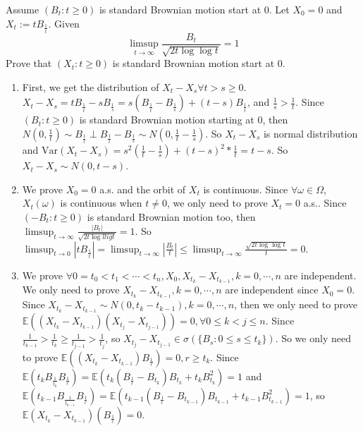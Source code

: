 \documentclass{ctexart}
\begin{document}
\begin{problem}\label{pro:4}
  Assume \((B_t:t \geq 0)\) is standard Brownian motion start at \(0\).
  Let \(X_0=0\) and \(X_t:=t B_{\frac{1}{t}}\).
  Given
  \[
    \limsup_{t \to \infty}\frac{B_{t}}{\sqrt{2t \log \log t}}=1
  \]
  Prove that \((X_t:t \geq 0)\) is standard Brownian motion start at \(0\).
\end{problem}
\begin{solution}
  \begin{enumerate}
    \item First, we get the distribution of \(X_t-X_s \forall t > s \geq0\). \(X_t-X_s=t B_{\frac{1}{t}}-s B_{\frac{1}{s}}=s(B_{\frac{1}{t}}-B_{\frac{1}{s}})+(t-s)B_{\frac{1}{t}}\),
      and \(\frac{1}{s} > \frac{1}{t}\). Since \((B_t:t \geq 0)\) is standard Brownian motion starting at 0, then \(N(0, \frac{1}{t})\sim B_{\frac{1}{t}} \perp B_{\frac{1}{t}} - B_{\frac{1}{s}}\sim N(0,\frac{1}{t }-\frac{1}{s})\).
      So \(X_t-X_s\) is normal distribution and \(\mathrm{Var}(X_t-X_s)=s^2(\frac{1}{t}-\frac{1}{s}) + (t-s)^2*\frac{1}{t}=t-s\).
      So \(X_t-X_s \sim N(0, t-s)\).
    \item We prove \(X_0=0\) a.s. and the orbit of \(X_t\) is continuous.
      Since \(\forall \omega \in \Omega\), \(X_t(\omega)\) is continuous when \(t \neq 0\), we only need to prove \(X_t=0\) a.s..
      Since \((-B_t: t \geq 0)\) is standard Brownian motion too, then \(\limsup_{t \to \infty} \frac{|B_t|}{\sqrt{2t \log llig t}}=1\).
      So \(\limsup_{t \to 0}|tB_{\frac{1}{t}}|= \limsup_{t \to \infty} |\frac{B_t}{t}| \leq \limsup_{t \to \infty} \frac{\sqrt{2t \log \log t}}{t}=0\).
    \item We prove \(\forall 0=t_0 < t_1 <\cdots<t_n, X_0, X_{t_k}-X_{t_{k-1}}, k=0,\cdots,n\) are independent.
      We only need to prove \(X_{t_k}-X_{t_{k-1}}, k=0,\cdots,n\) are independent since \(X_0=0\).
      Since \(X_{t_k}-X_{t_{k-1}} \sim N(0, t_k-t_{k-1}), k=0,\cdots,n\),
      then we only need to prove \(\mathbb{E}((X_{t_k}-X_{t_{k-1}})(X_{t_j}-X_{t_{j-1}}))=0, \forall 0 \leq k<j \leq n\).
      Since \(\frac{1}{t_{k-1}} > \frac{1}{t_k} \geq \frac{1}{t_{j-1}}> \frac{1}{t_j}\), so \(X_{t_j}-X_{t_{j-1}} \in \sigma(\{B_{s}:0 \leq s \leq t_{k}\})\).
      So we only need to prove \(\mathbb{E}((X_{t_k}-X_{t_{k-1}})B_{\frac{1}{r}})=0, r \geq t_{k}\).
      Since \(\mathbb{E}(t_kB_{\frac{1}{t_k}}B_{\frac{1}{r}})=\mathbb{E}(t_k(B_{\frac{1}{r}}-B_{t_k})B_{t_k} + t_kB_{t_k}^2)=1\)
      and \(\mathbb{E}(t_{k-1}B_{\frac{1}{t_{k-1}}}B_{\frac{1}{r}})=\mathbb{E}(t_{k-1}(B_{\frac{1}{r}}-B_{t_{k-1}})B_{t_{k-1}} + t_{k-1}B_{t_{k-1}}^2)=1\),
      so \(\mathbb{E}(X_{t_k}-X_{t_{k-1}})(B_{\frac{1}{r}})=0\).

  \end{enumerate}

\end{solution}
\end{document}

